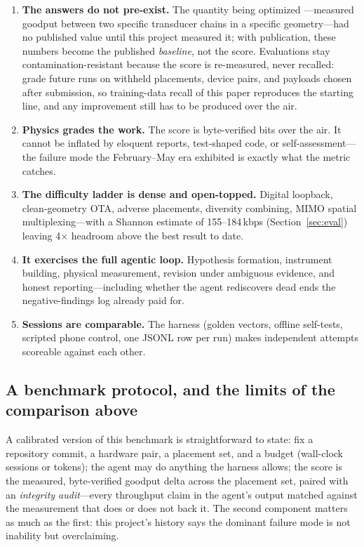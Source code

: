 \documentclass[11pt]{article}
\begin{document}
\begin{enumerate}
  \item \textbf{The answers do not pre-exist.} The quantity being optimized
        ---measured goodput between two specific transducer chains in a
        specific geometry---had no published value until this project
        measured it; with publication, these numbers become the published
        \emph{baseline}, not the score. Evaluations stay
        contamination-resistant because the score is re-measured, never
        recalled: grade future runs on withheld placements, device pairs,
        and payloads chosen after submission, so training-data recall of
        this paper reproduces the starting line, and any improvement still
        has to be produced over the air.
  \item \textbf{Physics grades the work.} The score is byte-verified bits
        over the air. It cannot be inflated by eloquent reports,
        test-shaped code, or self-assessment---the failure mode the
        February--May era exhibited is exactly what the metric catches.
  \item \textbf{The difficulty ladder is dense and open-topped.} Digital
        loopback, clean-geometry OTA, adverse placements, diversity
        combining, MIMO spatial multiplexing---with a Shannon estimate of
        155--184\,kbps (Section~\ref{sec:eval}) leaving 4$\times$ headroom
        above the best result to date.
  \item \textbf{It exercises the full agentic loop.} Hypothesis formation,
        instrument building, physical measurement, revision under ambiguous
        evidence, and honest reporting---including whether the agent
        rediscovers dead ends the negative-findings log already paid for.
  \item \textbf{Sessions are comparable.} The harness (golden vectors,
        offline self-tests, scripted phone control, one JSONL row per run)
        makes independent attempts scoreable against each other.
\end{enumerate}

\subsection{A benchmark protocol, and the limits of the comparison above}

A calibrated version of this benchmark is straightforward to state: fix a
repository commit, a hardware pair, a placement set, and a budget (wall-clock
sessions or tokens); the agent may do anything the harness allows; the score
is the measured, byte-verified goodput delta across the placement set,
paired with an \emph{integrity audit}---every throughput claim in the
agent's output matched against the measurement that does or does not back
it. The second component matters as much as the first: this project's
history says the dominant failure mode is not inability but overclaiming.
\end{document}
